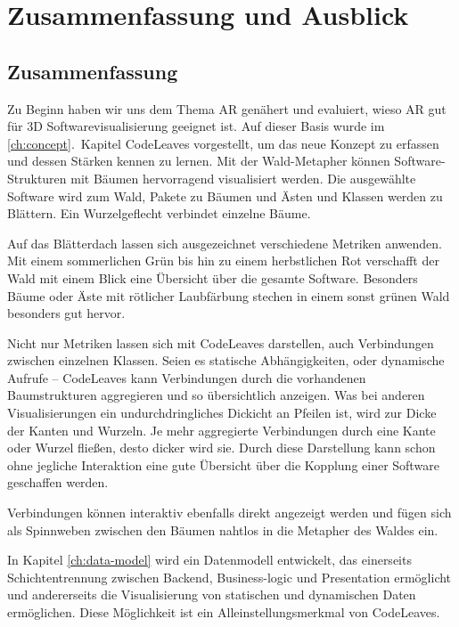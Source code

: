 \chapter{Zusammenfassung und Ausblick}
\label{ch:conclusion}

\section{Zusammenfassung}

Zu Beginn haben wir uns dem Thema AR genähert und evaluiert, wieso AR gut für 3D Softwarevisualisierung geeignet ist. Auf dieser Basis wurde im \ref{ch:concept}.\ Kapitel CodeLeaves vorgestellt, um das neue Konzept zu erfassen und dessen Stärken kennen zu lernen. Mit der Wald-Metapher können Software-Strukturen mit Bäumen hervorragend visualisiert werden. Die ausgewählte Software wird zum Wald, Pakete zu Bäumen und Ästen und Klassen werden zu Blättern. Ein Wurzelgeflecht verbindet einzelne Bäume.

Auf das Blätterdach lassen sich ausgezeichnet verschiedene Metriken anwenden. Mit einem sommerlichen Grün bis hin zu einem herbstlichen Rot verschafft der Wald mit einem Blick eine Übersicht über die gesamte Software. Besonders Bäume oder Äste mit rötlicher Laubfärbung stechen in einem sonst grünen Wald besonders gut hervor.

Nicht nur Metriken lassen sich mit CodeLeaves darstellen, auch Verbindungen zwischen einzelnen Klassen. Seien es statische Abhängigkeiten, oder dynamische Aufrufe -- CodeLeaves kann Verbindungen durch die vorhandenen Baumstrukturen aggregieren und so übersichtlich anzeigen. Was bei anderen Visualisierungen ein undurchdringliches Dickicht an Pfeilen ist, wird zur Dicke der Kanten und Wurzeln. Je mehr aggregierte Verbindungen durch eine Kante oder Wurzel fließen, desto dicker wird sie. Durch diese Darstellung kann schon ohne jegliche Interaktion eine gute Übersicht über die Kopplung einer Software geschaffen werden.

Verbindungen können interaktiv ebenfalls direkt angezeigt werden und fügen sich als Spinnweben zwischen den Bäumen nahtlos in die Metapher des Waldes ein.

In Kapitel \ref{ch:data-model} wird ein Datenmodell entwickelt, das einerseits Schichtentrennung zwischen Backend, Business-logic und Presentation ermöglicht und andererseits die Visualisierung von statischen und dynamischen Daten ermöglichen. Diese Möglichkeit ist ein Alleinstellungsmerkmal von CodeLeaves.

